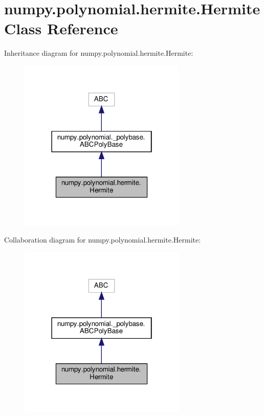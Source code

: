 \hypertarget{classnumpy_1_1polynomial_1_1hermite_1_1Hermite}{}\section{numpy.\+polynomial.\+hermite.\+Hermite Class Reference}
\label{classnumpy_1_1polynomial_1_1hermite_1_1Hermite}


Inheritance diagram for numpy.\+polynomial.\+hermite.\+Hermite\+:
\nopagebreak
\begin{figure}[H]
\begin{center}
\leavevmode
\includegraphics[width=226pt]{classnumpy_1_1polynomial_1_1hermite_1_1Hermite__inherit__graph}
\end{center}
\end{figure}


Collaboration diagram for numpy.\+polynomial.\+hermite.\+Hermite\+:
\nopagebreak
\begin{figure}[H]
\begin{center}
\leavevmode
\includegraphics[width=226pt]{classnumpy_1_1polynomial_1_1hermite_1_1Hermite__coll__graph}
\end{center}
\end{figure}
